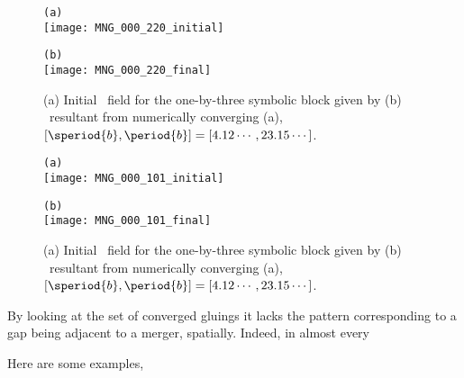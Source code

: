 \begin{description}
{%
\begin{figure}
\begin{minipage}[height=.4\textheight]{.5\textwidth}
\centering \small{\texttt{(a)}}\\
\texttt{[image: MNG\_000\_220\_initial]}
\end{minipage}
\begin{minipage}[height=.4\textheight]{.5\textwidth}
\centering \small{\texttt{(b)}}\\
\texttt{[image: MNG\_000\_220\_final]}
\end{minipage}
\caption{ \label{fig:block001}
(a) Initial \spt\ field for the one-by-three symbolic block given by 
(b) \twoT\ resultant from numerically converging (a),
$[\speriod{b},\period{b}]=[4.12\cdots,23.15\cdots ]$.
}
\end{figure}

\begin{figure}
\begin{minipage}[height=.4\textheight]{.5\textwidth}
\centering \small{\texttt{(a)}}\\
\texttt{[image: MNG\_000\_101\_initial]}
\end{minipage}
\begin{minipage}[height=.4\textheight]{.5\textwidth}
\centering \small{\texttt{(b)}}\\
\texttt{[image: MNG\_000\_101\_final]}
\end{minipage}
\caption{ \label{fig:block000_101}
(a) Initial \spt\ field for the one-by-three symbolic block given by 
(b) \twoT\ resultant from numerically converging (a),
$[\speriod{b},\period{b}]=[4.12\cdots,23.15\cdots ]$.
}
\end{figure}

By looking at the set of converged gluings it lacks the pattern corresponding
to a gap being adjacent to a merger, spatially. %
Indeed, in almost every

Here are some examples,


}
\end{description}

